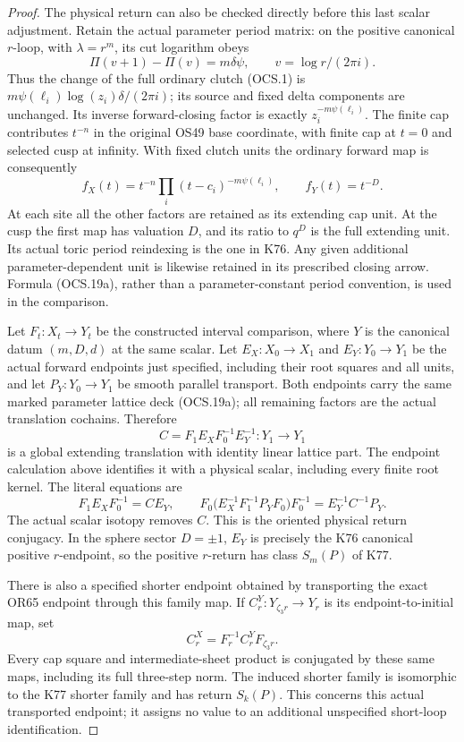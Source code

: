 \begin{proof}
The physical return can also be checked directly before this last
scalar adjustment. Retain the actual parameter period matrix:
on the positive canonical \(r\)-loop, with \(\lambda=r^m\),
its cut logarithm obeys
\[
             \Pi(v+1)-\Pi(v)=m\delta\psi,
                \qquad v=\log r/(2\pi i).
\tag{OCS.19a}
\]
Thus the change of the full ordinary clutch (OCS.1) is
\(m\psi(\ell_i)\log(z_i)\delta/(2\pi i)\); its source and
fixed delta components are unchanged. Its inverse forward-closing
factor is exactly \(z_i^{-m\psi(\ell_i)}\). The finite cap
contributes \(t^{-n}\) in the original OS49 base coordinate, with
finite cap at \(t=0\) and selected cusp at infinity. With fixed
clutch units the ordinary forward map is consequently
\[
 f_X(t)=t^{-n}\prod_i(t-c_i)^{-m\psi(\ell_i)},
 \qquad f_Y(t)=t^{-D}.                               \tag{OCS.19b}
\]
At each site all the other factors are retained as its extending
cap unit. At the cusp the first map has valuation \(D\), and its
ratio to \(q^D\) is the full extending unit. Its actual toric
period reindexing is the one in K76. Any given additional
parameter-dependent unit is likewise retained in its prescribed
closing arrow. Formula (OCS.19a), rather than a parameter-constant
period convention, is used in the comparison.

Let \(F_t:X_t\to Y_t\) be the constructed interval comparison,
where \(Y\) is the canonical datum \((m,D,d)\) at the same scalar.
Let \(E_X:X_0\to X_1\) and \(E_Y:Y_0\to Y_1\) be the actual
forward endpoints just specified, including their root squares and
all units, and let \(P_Y:Y_0\to Y_1\) be smooth parallel transport.
Both endpoints carry the same marked parameter lattice deck
(OCS.19a); all remaining factors are the actual translation
cochains. Therefore
\[
 C=F_1E_XF_0^{-1}E_Y^{-1}:Y_1\longrightarrow Y_1
\]
is a global extending translation with identity linear lattice
part. The endpoint calculation above identifies it with a physical
scalar, including every finite root kernel. The literal equations
are
\[
 F_1E_XF_0^{-1}=CE_Y,\qquad
 F_0\bigl(E_X^{-1}F_1^{-1}P_YF_0\bigr)F_0^{-1}
                       =E_Y^{-1}C^{-1}P_Y.            \tag{OCS.19c}
\]
The actual scalar isotopy removes \(C\). This is the oriented
physical return conjugacy. In the sphere sector \(D=\pm1\),
\(E_Y\) is precisely the K76 canonical positive \(r\)-endpoint,
so the positive \(r\)-return has class \(S_m(P)\) of K77.

There is also a specified shorter endpoint obtained by transporting
the exact OR65 endpoint through this family map. If
\(C^Y_r:Y_{\zeta_3r}\to Y_r\) is its endpoint-to-initial map, set
\[
                 C^X_r=F_r^{-1}C^Y_rF_{\zeta_3r}.
\tag{OCS.19d}
\]
Every cap square and intermediate-sheet product is conjugated by
these same maps, including its full three-step norm. The induced
shorter family is isomorphic to the K77 shorter family and has
return \(S_k(P)\). This concerns this actual transported endpoint;
it assigns no value to an additional unspecified short-loop
identification.


\end{proof}
